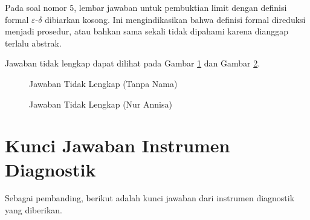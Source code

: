 \documentclass[12pt,a4paper,openany]{book}
\theoremstyle{definition}
\begin{document}
Pada soal nomor 5, lembar jawaban untuk pembuktian limit dengan definisi formal $\varepsilon$-$\delta$ dibiarkan kosong. Ini mengindikasikan bahwa definisi formal direduksi menjadi prosedur, atau bahkan sama sekali tidak dipahami karena dianggap terlalu abstrak.

Jawaban tidak lengkap dapat dilihat pada Gambar \ref{fig:tidaklengkap1} dan Gambar \ref{fig:tidaklengkap2}.

\begin{figure}[h]
\centering
\caption{Jawaban Tidak Lengkap (Tanpa Nama)}
\label{fig:tidaklengkap1}
\end{figure}

\begin{figure}[h]
\centering
\caption{Jawaban Tidak Lengkap (Nur Annisa)}
\label{fig:tidaklengkap2}
\end{figure}

\section{Kunci Jawaban Instrumen Diagnostik}

Sebagai pembanding, berikut adalah kunci jawaban dari instrumen diagnostik yang diberikan.
\end{document}
